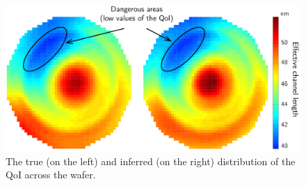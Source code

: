 \begin{figure}[b!]
  \vspace{-1.5em}
  \centering
  \includegraphics[width=1\linewidth]{include/figures/wafer-qoi.pdf}
  \caption{The true (on the left) and inferred (on the right) distribution of the QoI across the wafer.}
\end{figure}
